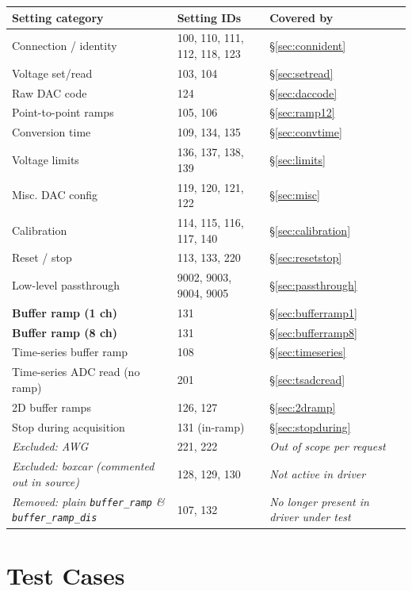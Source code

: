 \documentclass[11pt]{article}
\begin{document}
\begin{longtable}{L{4.6cm}L{2.6cm}L{6.8cm}}
\toprule
\textbf{Setting category} & \textbf{Setting IDs} & \textbf{Covered by} \\
\midrule
\endhead
Connection / identity & 100, 110, 111, 112, 118, 123 & \S\ref{sec:connident} \\
Voltage set/read & 103, 104 & \S\ref{sec:setread} \\
Raw DAC code & 124 & \S\ref{sec:daccode} \\
Point-to-point ramps & 105, 106 & \S\ref{sec:ramp12} \\
Conversion time & 109, 134, 135 & \S\ref{sec:convtime} \\
Voltage limits & 136, 137, 138, 139 & \S\ref{sec:limits} \\
Misc. DAC config & 119, 120, 121, 122 & \S\ref{sec:misc} \\
Calibration & 114, 115, 116, 117, 140 & \S\ref{sec:calibration} \\
Reset / stop & 113, 133, 220 & \S\ref{sec:resetstop} \\
Low-level passthrough & 9002, 9003, 9004, 9005 & \S\ref{sec:passthrough} \\
\textbf{Buffer ramp (1 ch)} & 131 & \S\ref{sec:bufferramp1} \\
\textbf{Buffer ramp (8 ch)} & 131 & \S\ref{sec:bufferramp8} \\
Time-series buffer ramp & 108 & \S\ref{sec:timeseries} \\
Time-series ADC read (no ramp) & 201 & \S\ref{sec:tsadcread} \\
2D buffer ramps & 126, 127 & \S\ref{sec:2dramp} \\
Stop during acquisition & 131 (in-ramp) & \S\ref{sec:stopduring} \\
\midrule
\textit{Excluded: AWG} & 221, 222 & \textit{Out of scope per request} \\
\textit{Excluded: boxcar (commented out in source)} & 128, 129, 130 & \textit{Not active in driver} \\
\textit{Removed: plain \texttt{buffer\_ramp} \& \texttt{buffer\_ramp\_dis}} & 107, 132 & \textit{No longer present in driver under test} \\
\bottomrule
\end{longtable}

\section{Test Cases}
\end{document}
